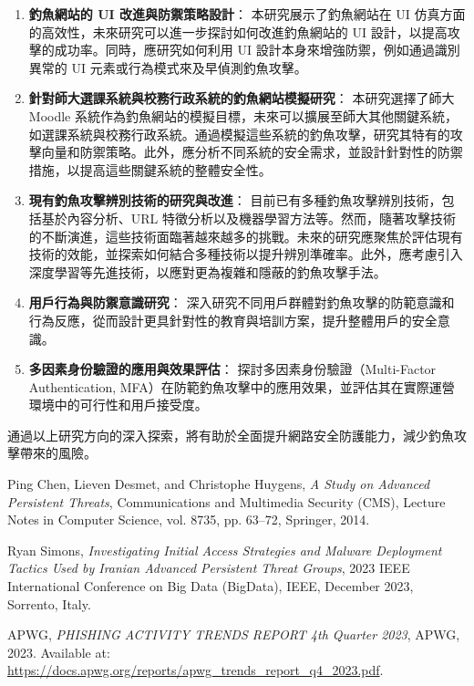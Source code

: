 \documentclass[a4paper,12pt]{article}
\begin{document}
\begin{enumerate}

    \item \textbf{釣魚網站的 UI 改進與防禦策略設計}：
    本研究展示了釣魚網站在 UI 仿真方面的高效性，未來研究可以進一步探討如何改進釣魚網站的 UI 設計，以提高攻擊的成功率。同時，應研究如何利用 UI 設計本身來增強防禦，例如通過識別異常的 UI 元素或行為模式來及早偵測釣魚攻擊。

    \item \textbf{針對師大選課系統與校務行政系統的釣魚網站模擬研究}：
    本研究選擇了師大 Moodle 系統作為釣魚網站的模擬目標，未來可以擴展至師大其他關鍵系統，如選課系統與校務行政系統。通過模擬這些系統的釣魚攻擊，研究其特有的攻擊向量和防禦策略。此外，應分析不同系統的安全需求，並設計針對性的防禦措施，以提高這些關鍵系統的整體安全性。
    
    \item \textbf{現有釣魚攻擊辨別技術的研究與改進}：
    目前已有多種釣魚攻擊辨別技術，包括基於內容分析、URL 特徵分析以及機器學習方法等。然而，隨著攻擊技術的不斷演進，這些技術面臨著越來越多的挑戰。未來的研究應聚焦於評估現有技術的效能，並探索如何結合多種技術以提升辨別準確率。此外，應考慮引入深度學習等先進技術，以應對更為複雜和隱蔽的釣魚攻擊手法。

    \item \textbf{用戶行為與防禦意識研究}：
    深入研究不同用戶群體對釣魚攻擊的防範意識和行為反應，從而設計更具針對性的教育與培訓方案，提升整體用戶的安全意識。

    \item \textbf{多因素身份驗證的應用與效果評估}：
    探討多因素身份驗證（Multi-Factor Authentication, MFA）在防範釣魚攻擊中的應用效果，並評估其在實際運營環境中的可行性和用戶接受度。

\end{enumerate}

通過以上研究方向的深入探索，將有助於全面提升網路安全防護能力，減少釣魚攻擊帶來的風險。
\begin{thebibliography}{9} %

Ping Chen, Lieven Desmet, and Christophe Huygens, 
\textit{A Study on Advanced Persistent Threats}, 
Communications and Multimedia Security (CMS), Lecture Notes in Computer Science, vol. 8735, pp. 63--72, Springer, 2014.

Ryan Simons, 
\textit{Investigating Initial Access Strategies and Malware Deployment Tactics Used by Iranian Advanced Persistent Threat Groups}, 
2023 IEEE International Conference on Big Data (BigData), IEEE, December 2023, Sorrento, Italy. 

APWG, \textit{PHISHING ACTIVITY TRENDS REPORT 4th Quarter 2023}, 
APWG, 2023. Available at: \url{https://docs.apwg.org/reports/apwg_trends_report_q4_2023.pdf}.


\end{thebibliography}


\end{document}
